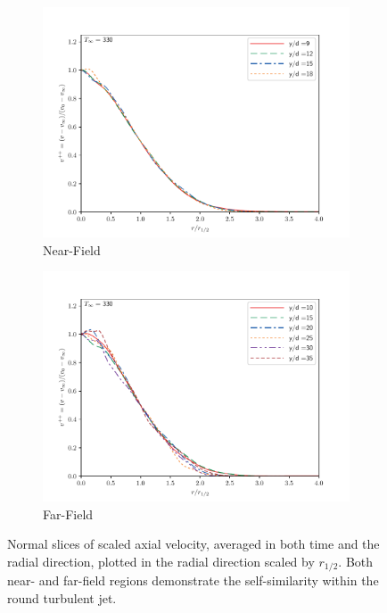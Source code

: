 \begin{figure}[htbp!]
\begin{center}
\begin{subfigure}{0.45\textwidth}
	\includegraphics[scale=.45]{figures/Plots/radial/slices_3/same_ambient/r_vs_v.pdf}
	\caption{Near-Field} \label{330_r_vs_v_1}
\end{subfigure}
\begin{subfigure}{0.45\textwidth}
	\includegraphics[scale=.45]{figures/Plots/radial/slices_5/same_ambient/r_vs_v.pdf}
	\caption{Far-Field} \label{330_r_vs_v_2}
\end{subfigure}
\caption{Normal slices of scaled axial velocity, averaged in both time and the radial direction, plotted in the radial direction scaled by $r_{1/2}$. Both near- and far-field regions demonstrate the self-similarity within the round turbulent jet.}
\label{330_r_v_features}
\end{center}
\end{figure}

